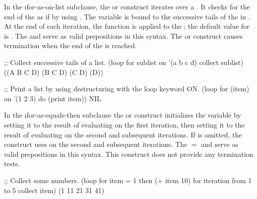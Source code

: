 \endsubsubsubsection%


In the \i{for-as-on-list} subclause, the  or 
construct iterates over
a . It checks for the
end of the  as if by using .
The variable  is bound to the successive tails of the 
 in 
.  At the end of each iteration, the function 
 is applied to the ; the default value for  is .
 The   and  serve as valid
prepositions in this syntax.
The  or  construct causes termination when the
end of the  is reached.
 

\code
;; Collect successive tails of a list.
 (loop for sublist on '(a b c d)
       collect sublist)
\EV ((A B C D) (B C D) (C D) (D))
 
;; Print a list by using destructuring with the loop keyword ON.
 (loop for (item) on '(1 2 3)
       do (print item))
\EV NIL
 
\endcode

\endsubsubsubsubsection%

\endsubsubsubsection%


In the \i{for-as-equals-then} subclause
the  
or  construct 
initializes the variable  by setting it to the
  result of evaluating  on the first iteration, then setting
  it to the result of evaluating  on the second and
  subsequent iterations.  If  is omitted, the construct
  uses  on the second and
  subsequent iterations.  
The  {$=$} and  serve as valid prepositions
in this syntax. 
This construct does not provide any termination tests.
 

% 
\code
;; Collect some numbers.
 (loop for item = 1 then (+ item 10)
       for iteration from 1 to 5
       collect item)
\EV (1 11 21 31 41)
\endcode
 
